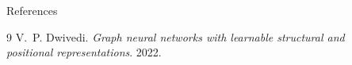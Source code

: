 \documentclass{beamer}
\newlength{\sepwidth}
\newlength{\colwidth}
\newcommand{\separatorcolumn}{\begin{column}{\sepwidth}\end{column}}
\begin{document}
\begin{frame}[t]
\begin{block}{}
\begin{columns}[t]
\begin{column}{\colwidth}
\begin{block}{References}
\begin{thebibliography}{9}
            V.~P. Dwivedi.
            \textit{Graph neural networks with learnable structural and positional representations}.
            2022.
    
        \end{thebibliography}

    \end{block}

\end{column}

\separatorcolumn

\end{columns}
\end{block}

\end{frame}
\end{document}
